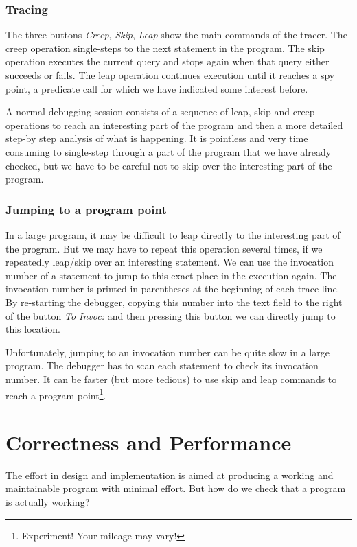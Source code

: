 \documentclass[a4paper,12pt]{report}
\begin{document}
\subsection{Tracing}
The three buttons {\it Creep}, {\it Skip}, {\it Leap} show the main commands of the tracer. The creep operation single-steps to the next statement in the program. The skip operation executes the current query and stops again when that query either succeeds or fails. The leap operation continues execution until it reaches a spy point, a predicate call for which we have indicated some interest before.

A normal debugging session consists of a sequence of leap, skip and creep operations to reach an interesting part of the program and then a more detailed step-by step analysis of what is happening. It is pointless and very time consuming to single-step through a part of the program that we have already checked, but we have to be careful not to skip over the interesting part of the program.

\subsection{Jumping to a program point}
In a large program, it may be difficult to leap directly to the interesting part of the program. But we may have to repeat this operation several times, if we repeatedly leap/skip over an interesting statement. We can use the invocation number of a statement to jump to this exact place in the execution again. The invocation number is printed in parentheses at the beginning of each trace line. By re-starting the debugger, copying this number into the text field to the right of the button {\it To Invoc:} and then pressing this button we can directly jump to this location.

Unfortunately, jumping to an invocation number can be quite slow in a large program. The debugger has to scan each statement to check its invocation number. It can be faster (but more tedious) to use skip and leap commands to reach a program point\footnote{Experiment! Your mileage may vary!}.

\chapter{Correctness and Performance}
\label{correctnessandperformance}

The effort in design and implementation is aimed at producing a working and maintainable program with minimal effort. But how do we check that a program is actually working?
\end{document}
